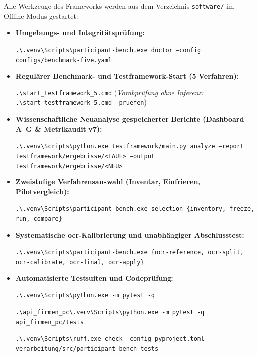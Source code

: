Alle Werkzeuge des Frameworks werden aus dem Verzeichnis \texttt{software/} im Offline-Modus gestartet:
\begin{itemize}
  \item \textbf{Umgebungs- und Integritätsprüfung:}
    \par{\footnotesize\texttt{.\textbackslash.venv\textbackslash Scripts\textbackslash participant-bench.exe doctor --config configs/benchmark-five.yaml}}
  \item \textbf{Regulärer Benchmark- und Testframework-Start (5 Verfahren):}
    \par{\footnotesize\texttt{.\textbackslash start\_testframework\_5.cmd}} \quad (\emph{Vorabprüfung ohne Inferenz:} {\footnotesize\texttt{.\textbackslash start\_testframework\_5.cmd --pruefen}})
  \item \textbf{Wissenschaftliche Neuanalyse gespeicherter Berichte (Dashboard A--G \& Metrikaudit v7):}
    \par{\footnotesize\texttt{.\textbackslash.venv\textbackslash Scripts\textbackslash python.exe testframework/main.py analyze --report testframework/ergebnisse/<LAUF> --output testframework/ergebnisse/<NEU>}}
  \item \textbf{Zweistufige Verfahrensauswahl (Inventar, Einfrieren, Pilotvergleich):}
    \par{\footnotesize\texttt{.\textbackslash.venv\textbackslash Scripts\textbackslash participant-bench.exe selection \{inventory, freeze, run, compare\}}}
  \item \textbf{Systematische \ac{ocr}-Kalibrierung und unabhängiger Abschlusstest:}
    \par{\footnotesize\texttt{.\textbackslash.venv\textbackslash Scripts\textbackslash participant-bench.exe \{ocr-reference, ocr-split, ocr-calibrate, ocr-final, ocr-apply\}}}
  \item \textbf{Automatisierte Testsuiten und Codeprüfung:}
    \par{\footnotesize\texttt{.\textbackslash.venv\textbackslash Scripts\textbackslash python.exe -m pytest -q}}
    \par{\footnotesize\texttt{.\textbackslash api\_firmen\_pc\textbackslash.venv\textbackslash Scripts\textbackslash python.exe -m pytest -q api\_firmen\_pc/tests}}
    \par{\footnotesize\texttt{.\textbackslash.venv\textbackslash Scripts\textbackslash ruff.exe check --config pyproject.toml verarbeitung/\allowbreak src/\allowbreak participant\_bench tests}}
\end{itemize}
